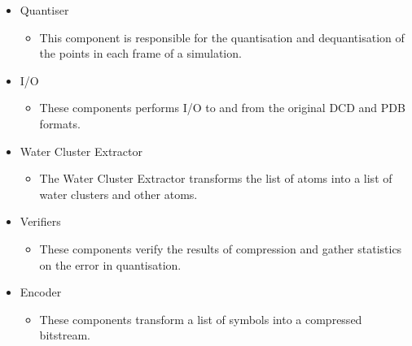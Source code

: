\documentclass[a4paper,11pt]{report}
\begin{document}
\begin{itemize}
 \item Quantiser
 \begin{itemize}
   \item This component is responsible for the quantisation and dequantisation of the points in each frame of a simulation.
 \end{itemize}
 \item I/O
 \begin{itemize}
   \item These components performs I/O to and from the original DCD and PDB formats. 
 \end{itemize}
 \item Water Cluster Extractor
 \begin{itemize}
   \item The Water Cluster Extractor transforms the list of atoms into a list of water clusters and other atoms.
 \end{itemize}
 \item Verifiers
 \begin{itemize}
   \item These components verify the results of compression and gather statistics on the error in quantisation.
 \end{itemize}
 \item Encoder
 \begin{itemize}
   \item These components transform a list of symbols into a compressed bitstream.
 \end{itemize}
\end{itemize}


% 

\end{document}
